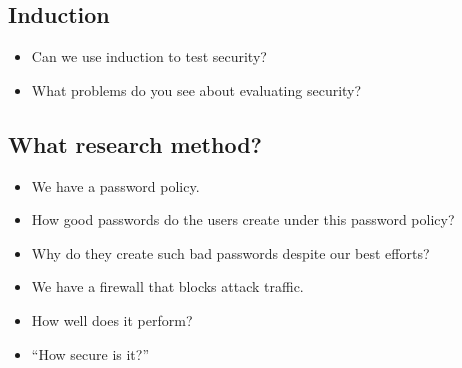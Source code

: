\subsection{Induction}

\begin{frame}
  \begin{question}
    \begin{itemize}
      \item Can we use induction to test security?
    \end{itemize}
  \end{question}

  \pause

  \begin{exercise}
    \begin{itemize}
      \item What problems do you see about evaluating security?
    \end{itemize}
  \end{exercise}
\end{frame}

\subsection{What research method?}

\begin{frame}
  \begin{exercise}
    \begin{itemize}
      \item We have a password policy.
      \item How good passwords do the users create under this password policy?
    \end{itemize}
  \end{exercise}

  \pause

  \begin{exercise}
    \begin{itemize}
      \item Why do they create such bad passwords despite our best efforts?
    \end{itemize}
  \end{exercise}
\end{frame}

\begin{frame}
  \begin{exercise}
    \begin{itemize}
      \item We have a firewall that blocks attack traffic.
      \item How well does it perform?
      \item \enquote{How secure is it?}
    \end{itemize}
  \end{exercise}
\end{frame}



\begin{frame}[allowframebreaks]
  \printbibliography
\end{frame}
